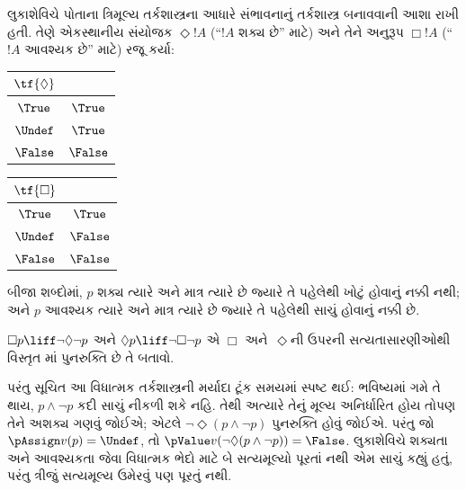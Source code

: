 લુકાશેવિચે પોતાના ત્રિમૂલ્ય તર્કશાસ્ત્રના આધારે સંભાવનાનું
તર્કશાસ્ત્ર બનાવવાની આશા રાખી હતી. તેણે એકસ્થાનીય
સંયોજક $\Diamond !A$ (``$!A$ શક્ય છે'' માટે) અને તેને અનુરૂપ
$\Box !A$ (``$!A$ આવશ્યક છે'' માટે) રજૂ કર્યા:
\begin{center}
  \begin{tabular}{c|c}
    $\tf{\Diamond}$ & \\
    \hline
    $\True$ & $\True$ \\
    $\Undef$ & $\True$ \\
    $\False$ & $\False$
  \end{tabular}
  \quad
  \begin{tabular}{c|c}
    $\tf{\Box}$ & \\
    \hline
    $\True$ & $\True$ \\
    $\Undef$ & $\False$ \\
    $\False$ & $\False$
  \end{tabular}
\end{center}
બીજા શબ્દોમાં, $p$ શક્ય ત્યારે અને માત્ર ત્યારે છે જ્યારે
તે પહેલેથી ખોટું હોવાનું નક્કી નથી; અને $p$ આવશ્યક ત્યારે
અને માત્ર ત્યારે છે જ્યારે તે પહેલેથી સાચું હોવાનું નક્કી છે.

\begin{prob}
  $\Box p \liff \lnot\Diamond \lnot p$ અને $\Diamond p \liff
  \lnot \Box \lnot p$ એ $\Box$ અને~$\Diamond$ની ઉપરની
  સત્યતાસારણીઓથી વિસ્તૃત \LogLuk[3]માં પુનરુક્તિ છે તે બતાવો.
\end{prob}

પરંતુ સૂચિત આ વિધાત્મક તર્કશાસ્ત્રની મર્યાદા ટૂંક સમયમાં
સ્પષ્ટ થઈ: ભવિષ્યમાં ગમે તે થાય, $p \land \lnot p$ કદી સાચું
નીકળી શકે નહિ. તેથી અત્યારે તેનું મૂલ્ય અનિર્ધારિત હોય તોપણ તેને
અશક્ય ગણવું જોઈએ; એટલે $\lnot \Diamond(p \land \lnot p)$ પુનરુક્તિ
હોવું જોઈએ. પરંતુ જો $\pAssign v(p) = \Undef$, તો
$\pValue v(\lnot \Diamond(p \land \lnot p)) = \False$.
લુકાશેવિચે શક્યતા અને આવશ્યકતા જેવા વિધાત્મક ભેદો માટે
બે સત્યમૂલ્યો પૂરતાં નથી એમ સાચું કહ્યું હતું, પરંતુ
ત્રીજું સત્યમૂલ્ય ઉમેરવું પણ પૂરતું નથી.
\endgroup


\begingroup
\makeatletter{}\makeatother


